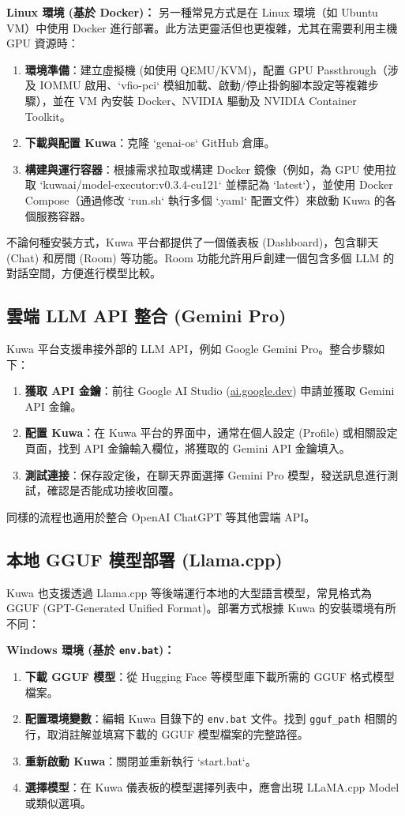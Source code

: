 \documentclass[twocolumn,11pt,a4paper]{article}
\begin{document}
\textbf{Linux 環境 (基於 Docker)：} 另一種常見方式是在 Linux 環境（如 Ubuntu VM）中使用 Docker 進行部署。此方法更靈活但也更複雜，尤其在需要利用主機 GPU 資源時：
\begin{enumerate}[noitemsep, topsep=0pt]
    \item \textbf{環境準備}：建立虛擬機 (如使用 QEMU/KVM)，配置 GPU Passthrough（涉及 IOMMU 啟用、`vfio-pci` 模組加載、啟動/停止掛鉤腳本設定等複雜步驟），並在 VM 內安裝 Docker、NVIDIA 驅動及 NVIDIA Container Toolkit。
    \item \textbf{下載與配置 Kuwa}：克隆 `genai-os` GitHub 倉庫。
    \item \textbf{構建與運行容器}：根據需求拉取或構建 Docker 鏡像（例如，為 GPU 使用拉取 `kuwaai/model-executor:v0.3.4-cu121` 並標記為 `latest`），並使用 Docker Compose（通過修改 `run.sh` 執行多個 `.yaml` 配置文件）來啟動 Kuwa 的各個服務容器。
\end{enumerate}
不論何種安裝方式，Kuwa 平台都提供了一個儀表板 (Dashboard)，包含聊天 (Chat) 和房間 (Room) 等功能。Room 功能允許用戶創建一個包含多個 LLM 的對話空間，方便進行模型比較。

\subsection{雲端 LLM API 整合 (Gemini Pro)}
Kuwa 平台支援串接外部的 LLM API，例如 Google Gemini Pro。整合步驟如下：
\begin{enumerate}[noitemsep, topsep=0pt]
    \item \textbf{獲取 API 金鑰}：前往 Google AI Studio (\url{ai.google.dev}) 申請並獲取 Gemini API 金鑰。
    \item \textbf{配置 Kuwa}：在 Kuwa 平台的界面中，通常在個人設定 (Profile) 或相關設定頁面，找到 API 金鑰輸入欄位，將獲取的 Gemini API 金鑰填入。
    \item \textbf{測試連接}：保存設定後，在聊天界面選擇 Gemini Pro 模型，發送訊息進行測試，確認是否能成功接收回覆。
\end{enumerate}
同樣的流程也適用於整合 OpenAI ChatGPT 等其他雲端 API。

\subsection{本地 GGUF 模型部署 (Llama.cpp)}
Kuwa 也支援透過 Llama.cpp 等後端運行本地的大型語言模型，常見格式為 GGUF (GPT-Generated Unified Format)。部署方式根據 Kuwa 的安裝環境有所不同：

\textbf{Windows 環境 (基於 \texttt{env.bat})：}
\begin{enumerate}[noitemsep, topsep=0pt]
    \item \textbf{下載 GGUF 模型}：從 Hugging Face 等模型庫下載所需的 GGUF 格式模型檔案。
    \item \textbf{配置環境變數}：編輯 Kuwa 目錄下的 \texttt{env.bat} 文件。找到 \texttt{gguf\_path} 相關的行，取消註解並填寫下載的 GGUF 模型檔案的完整路徑。
    \item \textbf{重新啟動 Kuwa}：關閉並重新執行 `start.bat`。
    \item \textbf{選擇模型}：在 Kuwa 儀表板的模型選擇列表中，應會出現 LLaMA.cpp Model 或類似選項。
\end{enumerate}
\end{document}
